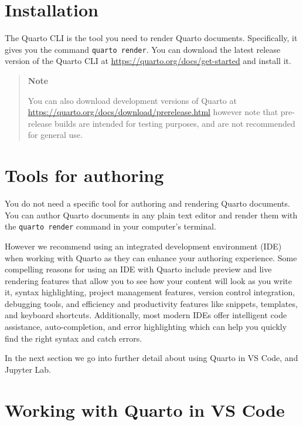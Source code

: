 \documentclass[
  letterpaper,
  DIV=11,
  numbers=noendperiod,
  oneside]{scrreprt}
\begin{document}
\begin{tcolorbox}
\section{Installation}\label{installation}

The Quarto CLI is the tool you need to render Quarto documents.
Specifically, it gives you the command \texttt{quarto\ render}. You can
download the latest release version of the Quarto CLI at
\href{https://quarto.org/docs/get-started/}{https://quarto.org/docs/get-started}
and install it.

\begin{quote}
\textbf{Note}

You can also download development versions of Quarto at
\url{https://quarto.org/docs/download/prerelease.html} however note that
pre-release builds are intended for testing purposes, and are not
recommended for general use.
\end{quote}

\section{Tools for authoring}\label{tools-for-authoring}

You do not need a specific tool for authoring and rendering Quarto
documents. You can author Quarto documents in any plain text editor and
render them with the \texttt{quarto\ render} command in your computer's
terminal.

However we recommend using an integrated development environment (IDE)
when working with Quarto as they can enhance your authoring experience.
Some compelling reasons for using an IDE with Quarto include preview and
live rendering features that allow you to see how your content will look
as you write it, syntax highlighting, project management features,
version control integration, debugging tools, and efficiency and
productivity features like snippets, templates, and keyboard shortcuts.
Additionally, most modern IDEs offer intelligent code assistance,
auto-completion, and error highlighting which can help you quickly find
the right syntax and catch errors.

In the next section we go into further detail about using Quarto in VS
Code, and Jupyter Lab.

\section{Working with Quarto in VS
Code}\label{working-with-quarto-in-vs-code}


\end{tcolorbox}
\end{document}
